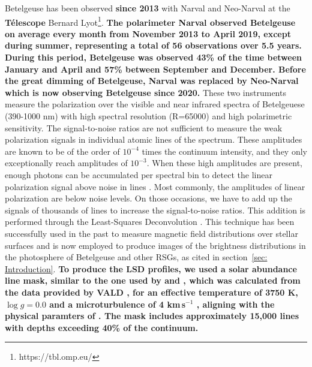 \documentclass{aa}
\def\kms {km\,s$^{-1}$ }
\begin{document}
Betelgeuse has been observed \textbf{since 2013} with Narval and Neo-Narval at the \textbf{Télescope} Bernard Lyot\footnote[1]{https://tbl.omp.eu/}. \textbf{ The polarimeter Narval observed Betelgeuse on average every month from November 2013 to April 2019, except during summer, representing a total of 56 observations over 5.5 years. During this period, Betelgeuse was observed 43\% of the time between January and April and 57\% between September and December. Before the great dimming of Betelgeuse, Narval was replaced by Neo-Narval which is now observing Betelgeuse since 2020. } These two instruments measure the polarization 
over the visible and near infrared spectra of Betelgeuese (390-1000 nm) with high spectral resolution (R=65000) and high polarimetric sensitivity. The signal-to-noise ratios are not sufficient to measure the weak polarization signals in individual atomic lines of the 
spectrum. These amplitudes are known to be of the order of $10^{-4}$ times the continuum intensity, and they only exceptionally reach amplitudes of $10^{-3}$. When these high amplitudes are present, enough photons can be accumulated per spectral bin to 
detect the linear polarization signal above noise in lines \citep{auriere_discovery_2016}. Most commonly, the amplitudes of linear polarization are below noise levels. On those 
occasions, we have to add up the signals of thousands of lines to increase the signal-to-noise ratios. This addition 
is performed through the Least-Squares Deconvolution \citep[LSD;][]{donati_spectropolarimetric_1997,kochukhov_least-squares_2010}.
This technique has been successfully used in the past to measure 
magnetic field distributions over stellar surfaces \citep[e.g][]{donatiLandstreet2009,reiners2012,kochukhov2021} and is now employed to produce images of the brightness distributions in the photosphere 
of Betelgeuse and other RSGs, as cited in section~\ref{sec: Introduction}. \textbf{ To produce the LSD profiles, we used a solar abundance line mask, similar to the one used by \cite{auriere_discovery_2016} and \cite{mathias_evolution_2018}, which was calculated from the data provided by VALD \citep{kupka_vald2_1999}, for an effective temperature of 3750 K, $\log g =0.0$ and a microturbulence of 4 \kms, aligning with the physical paramters of \cite{josselin_atmospheric_2007}. The mask includes approximately 15,000 lines with depths exceeding 40\% of the continuum.}
\end{document}
